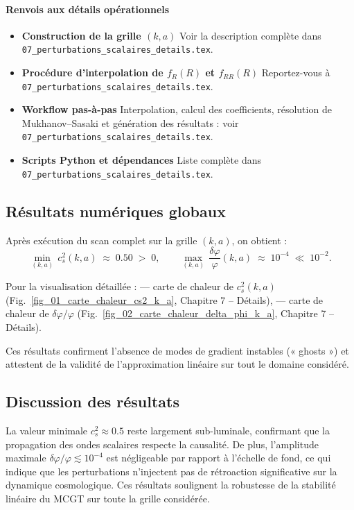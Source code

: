 \paragraph*{Renvois aux détails opérationnels}
\begin{itemize}
  \item \textbf{Construction de la grille \((k,a)\)}  
        Voir la description complète dans \texttt{07\_perturbations\_scalaires\_details.tex}.
  \item \textbf{Procédure d’interpolation de \(f_{R}(R)\) et \(f_{RR}(R)\)}  
        Reportez-vous à \texttt{07\_perturbations\_scalaires\_details.tex}.
  \item \textbf{Workflow pas-à-pas}  
        Interpolation, calcul des coefficients, résolution de Mukhanov–Sasaki et génération des résultats : voir \texttt{07\_perturbations\_scalaires\_details.tex}.
  \item \textbf{Scripts Python et dépendances}  
        Liste complète dans \texttt{07\_perturbations\_scalaires\_details.tex}.
\end{itemize}

\subsection{Résultats numériques globaux}
Après exécution du scan complet sur la grille \((k,a)\), on obtient :
\[
  \min_{(k,a)}\,c_{s}^{2}(k,a)\;\approx\;0.50\;>\;0,
  \qquad
  \max_{(k,a)}\,\frac{\delta\varphi}{\varphi}(k,a)\;\approx\;10^{-4}\;\ll\;10^{-2}.
\]

Pour la visualisation détaillée :  
— carte de chaleur de \(c_{s}^{2}(k,a)\) (Fig.~\ref{fig_01_carte_chaleur_cs2_k_a}, Chapitre 7 – Détails),  
— carte de chaleur de \(\delta\varphi/\varphi\) (Fig.~\ref{fig_02_carte_chaleur_delta_phi_k_a}, Chapitre 7 – Détails).

Ces résultats confirment l’absence de modes de gradient instables (« ghosts ») et attestent de la validité de l’approximation linéaire sur tout le domaine considéré.  

\subsection{Discussion des résultats}
La valeur minimale \(c_{s}^{2}\approx0.5\) reste largement sub-luminale, confirmant que la propagation des ondes scalaires respecte la causalité. De plus, l’amplitude maximale \(\delta\varphi/\varphi\lesssim10^{-4}\) est négligeable par rapport à l’échelle de fond, ce qui indique que les perturbations n’injectent pas de rétroaction significative sur la dynamique cosmologique. Ces résultats soulignent la robustesse de la stabilité linéaire du MCGT sur toute la grille considérée.

